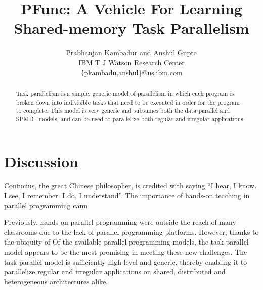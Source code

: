 \documentclass[9pt,twocolumn,letter]{article}
\begin{document}
\title{PFunc: A Vehicle For Learning Shared-memory Task Parallelism}

\author{
Prabhanjan Kambadur and Anshul Gupta\\ 
IBM T J Watson Research Center\\
{\texttt \{pkambadu,anshul\}@us.ibm.com}
}

\date{}

\maketitle


\begin{abstract} 
Task parallelism is a simple, generic model of parallelism in which each 
program is broken down into indivisible tasks that need to be executed in 
order for the program to complete.
%
This model is very generic and subsumes both the data parallel and
SPMD~\cite{darema2001} models, and can be used to parallelize both regular and
irregular applications.
%
\end{abstract}

\section{Discussion}
Confucius, the great Chinese philosopher, is credited with saying ``I hear,
I know. I see, I remember. I do, I understand''.
%
The importance of hands-on teaching in parallel programming cann

%
Previously, hands-on parallel programming were outside the reach of many 
classrooms due to the lack of parallel programming platforms.
% 
However, thanks to the ubiquity of 
Of the available parallel programming models, the task parallel model appears
to be the most promising in meeting these new challenges.  The task parallel
model is sufficiently high-level and generic, thereby enabling it to
parallelize regular and irregular applications on shared, distributed and
heterogeneous architectures alike.  
\end{document}
